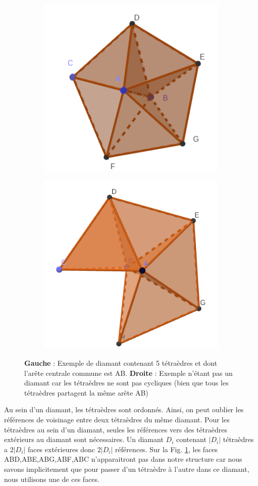 \begin{figure}[H]
\centering
\begin{subfigure}{.5\textwidth}
  \centering
  \includegraphics[scale=0.3]{Images/full_diamond}
  \caption{}
  \label{fig:full_diamond2}
\end{subfigure}%
\begin{subfigure}{.5\textwidth}
  \centering
  \includegraphics[scale=0.26]{Images/not_full_diamond}
  \caption{}
  \label{fig:not_full_diamond}
\end{subfigure}
\caption{\textbf{Gauche} : Exemple de diamant contenant 5 tétraèdres et dont l'arête centrale commune est AB. \textbf{Droite} : Exemple n'étant pas un diamant car les tétraèdres ne sont pas cycliques (bien que tous les tétraèdres partagent la même arête AB)}
\end{figure}
\noindent
Au sein d'un diamant, les tétraèdres sont ordonnés. Ainsi, on peut oublier les références de voisinage entre deux tétraèdres du même diamant. Pour les tétraèdres au sein d'un diamant, seules les références vers des tétraèdres extérieurs au diamant sont nécessaires. Un diamant $D_i$ contenant $|D_i|$ tétraèdres a $2|D_i|$ faces extérieures donc $2|D_i|$ références. Sur la Fig. \ref{fig:full_diamond2}, les faces ABD,ABE,ABG,ABF,ABC n'apparaitront pas dans notre structure car nous savons implicitement que pour passer d'un tétraèdre à l'autre dans ce diamant, nous utilisons une de ces faces.

